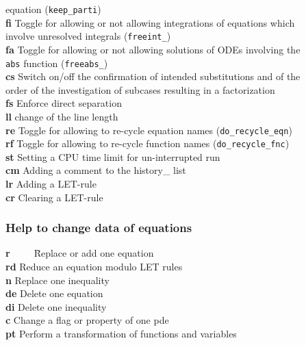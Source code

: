 \documentclass[12pt]{article}
\begin{document}
\begin{tabbing}
                        equation ({\tt keep\_parti}) \\
  {\bf fi}   \> Toggle for allowing or not allowing
                        integrations of equations which \\
             \> involve unresolved integrals ({\tt freeint\_})  \\
  {\bf fa}   \> Toggle for allowing or not allowing solutions of ODEs
                        involving the \\
             \> {\tt abs} function ({\tt freeabs\_})  \\
  {\bf cs}   \> Switch on/off the confirmation of intended substitutions
                and of the \\
             \> order of the investigation of subcases
                resulting in a factorization \\
  {\bf fs}   \> Enforce direct separation \\
  {\bf ll}   \> change of the line length \\
  {\bf re}   \> Toggle for allowing to re-cycle equation names
             ({\tt do\_recycle\_eqn})  \\
  {\bf rf}   \> Toggle for allowing to re-cycle function names
             ({\tt do\_recycle\_fnc}) \\
  {\bf st}   \> Setting a CPU time limit for un-interrupted run \\
  {\bf cm}   \> Adding a comment to the history\_ list \\
  {\bf lr}   \> Adding a LET-rule \\
  {\bf cr}   \> Clearing a LET-rule
\end{tabbing}

\subsubsection{Help to change data of equations}
\begin{tabbing}
  {\bf r}\ \ \ \ \ \= Replace or add one equation \\
  {\bf rd}   \> Reduce an equation modulo LET rules \\
  {\bf n}    \> Replace one inequality      \\
  {\bf de}   \> Delete one equation         \\
  {\bf di}   \> Delete one inequality       \\
  {\bf c}    \> Change a flag or property of one pde  \\
  {\bf pt}   \> Perform a transformation of functions and variables
\end{tabbing}
\end{document}
